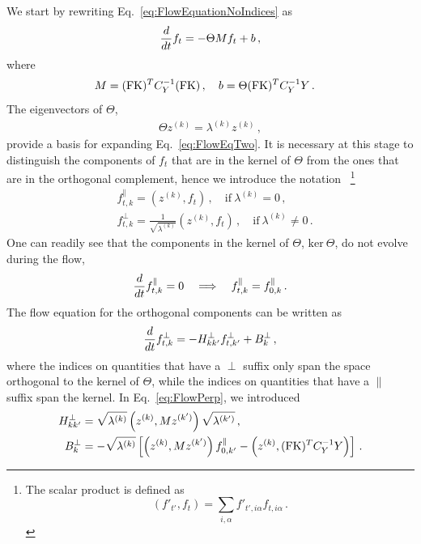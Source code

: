 We start by rewriting Eq.~\eqref{eq:FlowEquationNoIndices} as
\begin{align}
    \label{eq:FlowEqTwo}
    \frac{d}{dt} f_t = -\Theta M f_t + b\, ,
\end{align}
where
\begin{align}
    M &= (\mathrm{FK})^T C_Y^{-1} (\mathrm{FK})\, , \quad b = \Theta (\mathrm{FK})^T C_Y^{-1} Y\, .
\end{align}
The eigenvectors of $\Theta$,
\begin{align}
    \label{eq:ThetaEigensystem}
    \Theta z^{(k)} = \lambda^{(k)} z^{(k)}\, ,
\end{align}
provide a basis for expanding Eq.~\eqref{eq:FlowEqTwo}. It is necessary at this stage to distinguish
the components of $f_t$ that are in the kernel of $\Theta$ from the ones that are in the orthogonal
complement, hence we introduce the notation
~\footnote{
    The scalar product is defined as
    \[
        \left(f'_{t'}, f_t\right)
            = \sum_{i,\alpha} f'_{t',i\alpha} f_{t,i\alpha}\, .
    \]
}
\begin{align}
    \label{eq:ParallelCompnents}
    &f^\parallel_{t,k} = \left(z^{(k)}, f_t\right)\, , \quad \text{if}\ \lambda^{(k)} = 0\, , \\
    \label{eq:OrthogonalComponents}
    &f^\perp_{t,k} = \frac{1}{\sqrt{\lambda^{(k)}}} \left(z^{(k)}, f_t\right)\, , \quad
        \text{if}\ \lambda^{(k)} \neq 0\, .
\end{align}
One can readily see that the components in the kernel of $\Theta$, $\text{ker}\ \Theta$,
do not evolve during the flow,
\begin{align}
    \label{eq:FlowParallel}
    \frac{d}{dt} f^\parallel_{t,k} = 0
        \quad \Longrightarrow \quad f^\parallel_{t,k} = f^\parallel_{0,k}\, .
\end{align}
The flow equation for the orthogonal components can be written as
\begin{align}
    \label{eq:FlowPerp}
    \frac{d}{dt} f^\perp_{t,k} = - H^\perp_{kk'} f^\perp_{t,k'}
        + B^\perp_{k}\, ,
\end{align}
where the indices on quantities that have a $\perp$ suffix only span the space orthogonal to the kernel
of $\Theta$, while the indices on quantities that have a $\parallel$ suffix span the kernel.
In Eq.~\eqref{eq:FlowPerp}, we introduced
\begin{align}
    H^\perp_{kk'} &= \sqrt{\lambda^{(k)}} \left(z^{(k)}, M z^{(k')}\right) \sqrt{\lambda^{(k')}}\, ,\\
    B^\perp_k &= -\sqrt{\lambda^{(k)}} \left[\left(z^{(k)}, M z^{(k')}\right) f^\parallel_{0,k'}
        - \left(z^{(k)}, (\mathrm{FK})^T C_Y^{-1} Y\right)\right]\, .
\end{align}
